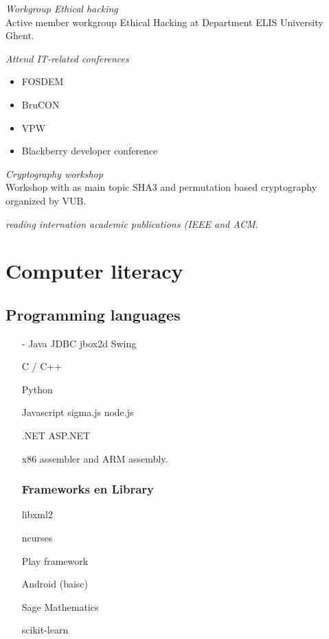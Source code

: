 \documentclass[margin, 10pt]{res} %
\begin{document}
\begin{resume}
{\sl Workgroup Ethical hacking} \\
Active member workgroup Ethical Hacking at Department ELIS University Ghent.

{\sl Attend IT-related conferences}
\begin{itemize} \itemsep -2pt
\item FOSDEM
\item BruCON
\item VPW
\item Blackberry developer conference
\end{itemize}

{\sl Cryptography workshop} \\
Workshop with as main topic SHA3 and permutation based cryptography organized by VUB. 


{\sl reading internation academic publications (IEEE and ACM.}

\end{resume}
\newpage
\section{Computer literacy}
\subsection{Programming languages}
\begin{multicols}{2}
\begin{enumerate}
\item[-] Java
\subitem JDBC
\subitem jbox2d
\subitem Swing
\item[] C / C++
\item[] Python
\item[] Javascript
\subitem sigma.js
\subitem node.js
\item[] .NET
\subitem ASP.NET
\item[] x86 assembler and ARM assembly.
\subsubsection*{Frameworks en Library}
\item[] libxml2
\item[] ncurses
\item[] Play framework
\item[] Android (baisc)
\item[] Sage Mathematics
\item[] scikit-learn
\end{enumerate}
\end{multicols}
\end{document}
